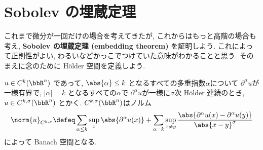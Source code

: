 \documentclass[openany, a4paper, oneside]{jsbook}
\begin{document}
\section{Sobolev の埋蔵定理}

これまで微分が一回だけの場合を考えてきたが, これからはもっと高階の場合も考え,
\textbf{Sobolev の埋蔵定理 (embedding theorem)} を証明しよう.
これによって正則性がよい, わるいなどかっこでつけていた意味がわかることと思う.
そのまえに念のために H\"older 空間を定義しよう.
\begin{defn}[H\"{o}lder 空間]
 $u \in C^k (\bbR^n)$ であって, $\abs{\alpha} \le k$ となるすべての多重指数$\alpha$について
 $\partial^{\alpha} u$が一様有界で, $|\alpha| = k$ となるすべての$\alpha$で
 $\partial^{\alpha} u$が一様に$\sigma$次 H\"older 連続のとき,
 $u \in C^{k, \sigma}(\bbR^n)$ とかく.
 $C^{k, \sigma}(\bbR^n)$はノルム
 \begin{align}
  \norm{u}_{C^{k, \sigma}}
  \defeq
  \sum_{\alpha \le k}\sup_{x} \abs{\partial^{\alpha}u (x)} +
   \sum_{\alpha = k}\sup_{x \neq y}
    \frac{\abs{\partial^{\alpha}u (x) - \partial^{\alpha}u (y)}}{\abs{x - y}^{\sigma}}
 \end{align}
 によって Banach 空間となる.
\end{defn}
\end{document}
